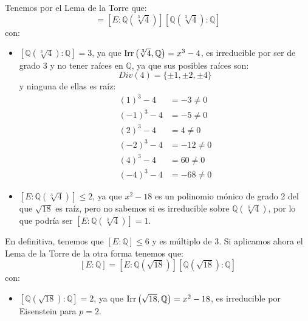 \begin{ejercicio}
\begin{enumerate}[label=\alph*)]
            Tenemos por el Lema de la Torre que:
            \begin{equation*}
                [E:\mathbb{Q}] = \left[E:\mathbb{Q}\left(\sqrt[3]{4}\right)\right]\left[\mathbb{Q}\left(\sqrt[3]{4}\right):\mathbb{Q}\right]
            \end{equation*}
            con:
            \begin{itemize}
                \item $\left[\mathbb{Q}\left(\sqrt[3]{4}\right):\mathbb{Q}\right] = 3$, ya que $\operatorname{Irr}\left(\sqrt[3]{4},\mathbb{Q}\right) = x^3-4$, es irreducible por ser de grado 3 y no tener raíces en $\mathbb{Q}$, ya que sus posibles raíces son:
                    \begin{equation*}
                        Div(4) = \{\pm1, \pm2, \pm4\}
                    \end{equation*}
                    y ninguna de ellas es raíz:
                    \begin{align*}
                        {(1)}^{3}-4 &= -3 \neq 0 \\
                        {(-1)}^{3}-4 &= -5 \neq 0 \\
                        {(2)}^{3}-4 &= 4 \neq 0 \\
                        {(-2)}^{3}-4 &= -12 \neq 0 \\
                        {(4)}^{3}-4 &= 60 \neq 0 \\
                        {(-4)}^{3}-4 &= -68 \neq 0
                    \end{align*}
                \item $\left[E:\mathbb{Q}\left(\sqrt[3]{4}\right)\right]\leq 2$, ya que $x^2-18$ es un polinomio mónico de grado 2 del que $\sqrt{18}$ es raíz, pero no sabemos si es irreducible sobre $\mathbb{Q}\left(\sqrt[3]{4}\right)$, por lo que podría ser $\left[E:\mathbb{Q}\left(\sqrt[3]{4}\right)\right] = 1$.
            \end{itemize}
            En definitiva, tenemos que $[E:\mathbb{Q}]\leq 6$ y es múltiplo de 3. Si aplicamos ahora el Lema de la Torre de la otra forma tenemos que:
            \begin{equation*}
                \left[E:\mathbb{Q}\right] = \left[E:\mathbb{Q}\left(\sqrt{18}\right)\right]\left[\mathbb{Q}\left(\sqrt{18}\right):\mathbb{Q}\right]
            \end{equation*}
            con:
            \begin{itemize}
                \item $\left[\mathbb{Q}\left(\sqrt{18}\right):\mathbb{Q}\right] = 2$, ya que $\operatorname{Irr}\left(\sqrt{18},\mathbb{Q}\right) = x^2-18$, es irreducible por Eisenstein para $p=2$.

\end{itemize}
\end{enumerate}
\end{ejercicio}
